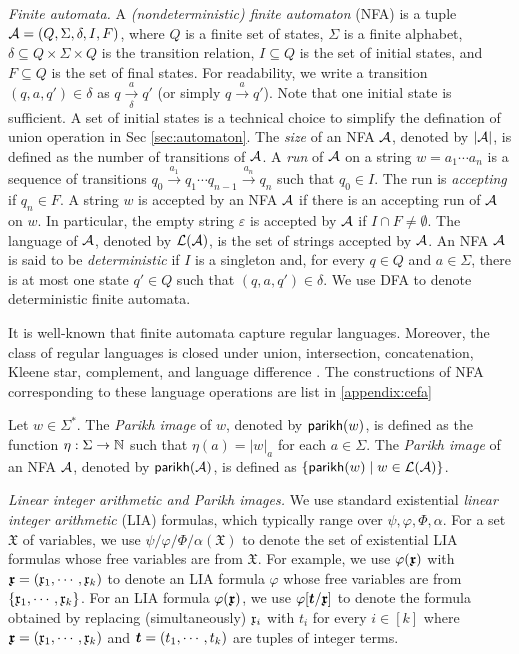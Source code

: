 \medskip
\noindent 
\emph{Finite automata.} 
A \emph{(nondeterministic) finite automaton} (NFA)  is a tuple $\mathcal{A}=(Q, \Sigma, \delta, I, F)$, where $Q$ is a finite set of states, $\Sigma$ is a finite alphabet, $\delta \subseteq Q \times \Sigma \times Q$ is the transition relation, $I \subseteq Q$ is the set of initial states, and $F \subseteq Q$ is the set of final states. For readability, we write a transition $(q, a, q') \in \delta$ as $q \xrightarrow[\delta]{a} q'$ (or simply $q \xrightarrow{a} q'$). Note that one initial state is sufficient. A set of initial states is a technical choice to simplify the defination of union operation in Sec \ref{sec:automaton}.
The \emph{size} of an NFA $\mathcal{A}$, denoted by $|\mathcal{A}|$, is defined as the number of transitions of $\mathcal{A}$.
%
A \emph{run} of $\mathcal{A}$ on a string $w = a_1 \cdots a_n$ is a sequence of transitions $q_0 \xrightarrow{a_1} q_1 \cdots q_{n-1} \xrightarrow{a_n} q_n$ such that $q_0 \in I$. The run is \emph{accepting} if $q_n \in F$.
A string $w$ is accepted by an NFA $\mathcal{A}$ if there is an accepting run of $\mathcal{A}$ on $w$. In particular, the empty string $\varepsilon$ is accepted by $\mathcal{A}$ if $I \cap F \neq \emptyset$. The language of $\mathcal{A}$, denoted by $\mathcal{L}(\mathcal{A})$, is the set of strings accepted by $\mathcal{A}$. 
%
An NFA $\mathcal{A}$ is said to be \emph{deterministic} if $I$ is a singleton and, for every $q \in Q$ and $a \in \Sigma$, there is at most one state $q' \in Q$ such that $(q, a, q') \in \delta$. We use DFA to denote deterministic finite automata. 
%

It is well-known that finite automata capture regular languages. 
Moreover, the class of regular languages is closed under union, intersection, concatenation, Kleene star, complement, and language difference \cite{HU79}. The constructions of NFA corresponding to these language operations are list in \ref{appendix:cefa}

Let $w \in \Sigma^*$. The \emph{Parikh image} of $w$, denoted by $\mathsf{parikh}(w)$, is defined as the function $\eta: \Sigma \rightarrow \mathbb{N}$ such that $\eta(a) = |w|_a$ for each $a \in \Sigma$. The \emph{Parikh image} of an NFA $\mathcal{A}$, denoted by $\mathsf{parikh}(\mathcal{A})$, is defined as $\{\mathsf{parikh}(w) \mid w \in \mathcal{L}(\mathcal{A})\}$.

\medskip
\noindent 
\emph{Linear integer arithmetic and Parikh images.}
We use standard existential \emph{linear integer arithmetic} (LIA) formulas, which
 typically range over $\psi, \varphi, \Phi, \alpha$. 
For a set $\mathfrak{X}$ of variables, we use $\psi/\varphi/\Phi/\alpha(\mathfrak{X})$ to denote the set of existential LIA formulas whose free variables are from $\mathfrak{X}$. 
For example, we use $\varphi(\vec{\anivar})$ with $\myvec{\anivar} = (\anivar_1, \cdots, \anivar_k)$ to denote an LIA formula $\varphi$ whose free variables are from $\{\mathfrak{x}_1, \cdots, \mathfrak{x}_k\}$. For an LIA formula $\varphi(\vec{\anivar})$, we use $\varphi[\myvec{t}/\myvec{\anivar}]$ to denote the formula obtained by replacing (simultaneously) $\mathfrak{x}_i$ with $t_i$ for every $i \in [k]$ where $\myvec{\anivar} = (\anivar_1, \cdots, \anivar_k)$ and $\myvec{t} = (t_1, \cdots, t_k)$ are tuples of integer terms.

